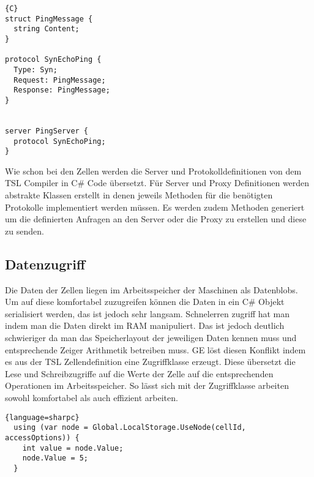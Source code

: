 \begin{lstlisting}{C}
struct PingMessage {
  string Content;
}

protocol SynEchoPing {
  Type: Syn;
  Request: PingMessage;
  Response: PingMessage;
}


server PingServer {
  protocol SynEchoPing;
}
\end{lstlisting}

Wie schon bei den Zellen werden die Server und Protokolldefinitionen von dem TSL Compiler in C\# Code übersetzt. Für Server und Proxy
Definitionen werden abstrakte Klassen erstellt in denen jeweils Methoden für die benötigten Protokolle implementiert werden müssen.
Es werden zudem Methoden generiert um die definierten Anfragen an den Server oder die Proxy zu erstellen und diese zu senden.


\subsection{Datenzugriff}

Die Daten der Zellen liegen im Arbeitsspeicher der Maschinen als Datenblobs. Um auf diese komfortabel zuzugreifen können die Daten in ein C\# Objekt
serialisiert werden, das ist jedoch sehr langsam.
Schnelerren zugriff hat man indem man die Daten direkt im RAM manipuliert. Das ist jedoch deutlich schwieriger da man das Speicherlayout der jeweiligen Daten
kennen muss und entsprechende Zeiger Arithmetik betreiben muss. GE löst diesen Konflikt indem es aus der TSL Zellendefinition eine Zugriffklasse erzeugt.
Diese übersetzt die Lese und Schreibzugriffe auf die Werte der Zelle auf die entsprechenden Operationen im Arbeitsspeicher. So lässt sich mit der Zugriffklasse arbeiten sowohl
komfortabel als auch effizient arbeiten.

\begin{lstlisting}{language=sharpc}
  using (var node = Global.LocalStorage.UseNode(cellId, accessOptions)) {
    int value = node.Value;
    node.Value = 5;
  }
\end{lstlisting}
